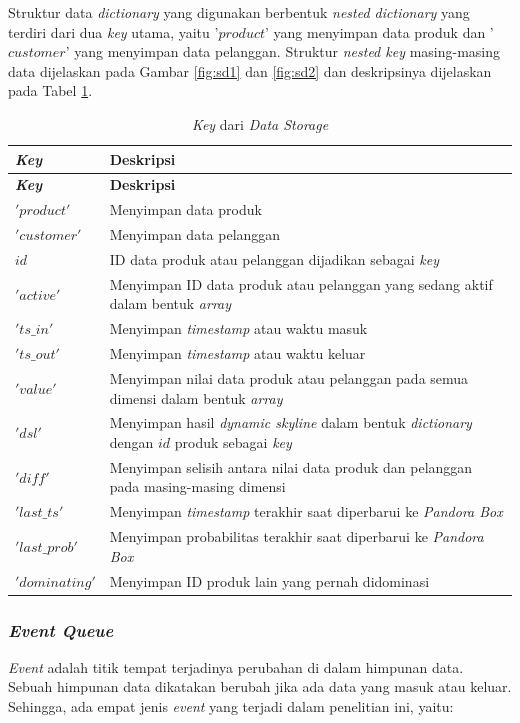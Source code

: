 Struktur data \textit{dictionary} yang digunakan berbentuk \textit{nested dictionary} yang terdiri dari dua \textit{key} utama, yaitu '$product$' yang menyimpan data produk dan '$customer$' yang menyimpan data pelanggan. Struktur \textit{nested key} masing-masing data dijelaskan pada Gambar \ref{fig:sd1} dan \ref{fig:sd2} dan deskripsinya dijelaskan pada Tabel \ref{tab:desc-key}.

\begin{longtable}{| p{2.5cm} | p{6.5cm} |}
	\caption{\textit{Key} dari \textit{Data Storage} \label{tab:desc-key}}
	\hline
	\textbf{\textit{Key}} & \textbf{Deskripsi} \\ \hline 
	\endfirsthead
	\hline
	\textbf{\textit{Key}} & \textbf{Deskripsi} \\ \hline 
	\endhead
	$'product'$ & Menyimpan data produk \\ \hline
	$'customer'$ & Menyimpan data pelanggan \\ \hline
	$id$ & ID data produk atau pelanggan dijadikan sebagai \textit{key} \\ \hline
	$'active'$ & Menyimpan ID data produk atau pelanggan yang sedang aktif dalam bentuk \textit{array} \\ \hline
	$'ts\_in'$ & Menyimpan \textit{timestamp} atau waktu masuk \\ \hline
	$'ts\_out'$ & Menyimpan \textit{timestamp} atau waktu keluar \\ \hline
	$'value'$ & Menyimpan nilai data produk atau pelanggan pada semua dimensi dalam bentuk \textit{array}\\ \hline
	$'dsl'$ & Menyimpan hasil \textit{dynamic skyline} dalam bentuk \textit{dictionary} dengan $id$ produk sebagai \textit{key}\\ \hline
	$'diff'$ & Menyimpan selisih antara nilai data produk dan pelanggan pada masing-masing dimensi \\ \hline
	$'last\_ts'$ & Menyimpan \textit{timestamp} terakhir saat diperbarui ke \textit{Pandora Box}\\ \hline
	$'last\_prob'$ & Menyimpan probabilitas terakhir saat diperbarui ke \textit{Pandora Box}\\ \hline
	$'dominating'$ & Menyimpan ID produk lain yang pernah didominasi\\ \hline
\end{longtable}

\subsubsection{\textit{Event Queue}}
\tab \textit{Event} adalah titik tempat terjadinya perubahan di dalam himpunan data. Sebuah himpunan data dikatakan berubah jika ada data yang masuk atau keluar. Sehingga, ada empat jenis \textit{event} yang terjadi dalam penelitian ini, yaitu:

